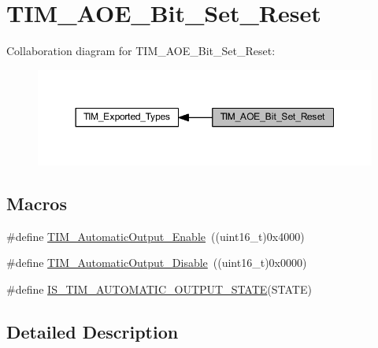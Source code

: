 \hypertarget{group___t_i_m___a_o_e___bit___set___reset}{}\section{T\+I\+M\+\_\+\+A\+O\+E\+\_\+\+Bit\+\_\+\+Set\+\_\+\+Reset}
\label{group___t_i_m___a_o_e___bit___set___reset}
Collaboration diagram for T\+I\+M\+\_\+\+A\+O\+E\+\_\+\+Bit\+\_\+\+Set\+\_\+\+Reset\+:
\nopagebreak
\begin{figure}[H]
\begin{center}
\leavevmode
\includegraphics[width=350pt]{group___t_i_m___a_o_e___bit___set___reset}
\end{center}
\end{figure}
\subsection*{Macros}
\begin{DoxyCompactItemize}
\item 
\#define \hyperlink{group___t_i_m___a_o_e___bit___set___reset_gaa416873d01fe62fe8d3f9c8bb7853fa1}{T\+I\+M\+\_\+\+Automatic\+Output\+\_\+\+Enable}~((uint16\+\_\+t)0x4000)
\item 
\#define \hyperlink{group___t_i_m___a_o_e___bit___set___reset_ga0f80ba4fbadd434bc82ca63e904ace41}{T\+I\+M\+\_\+\+Automatic\+Output\+\_\+\+Disable}~((uint16\+\_\+t)0x0000)
\item 
\#define \hyperlink{group___t_i_m___a_o_e___bit___set___reset_gaabce6b8865d80929bf69c6c3c7780846}{I\+S\+\_\+\+T\+I\+M\+\_\+\+A\+U\+T\+O\+M\+A\+T\+I\+C\+\_\+\+O\+U\+T\+P\+U\+T\+\_\+\+S\+T\+A\+TE}(S\+T\+A\+TE)
\end{DoxyCompactItemize}


\subsection{Detailed Description}


